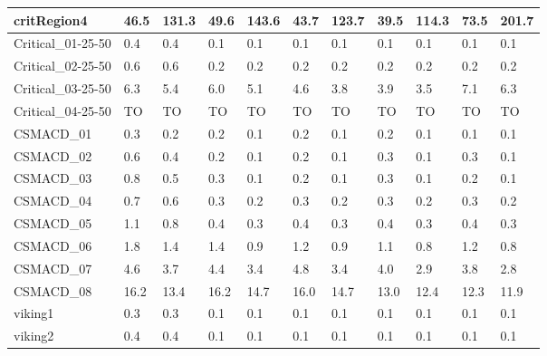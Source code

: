 \begin{table}
\begin{adjustbox}{max totalheight=\textheight}
\begin{tabular}{|l|llllllllll|}
    critRegion4        & 46.5     & 131.3    & 49.6     & 143.6    & 43.7     & 123.7    & 39.5     & 114.3    & 73.5     & 201.7    \\ \hline
    Critical\_01-25-50 & 0.4      & 0.4      & 0.1      & 0.1      & 0.1      & 0.1      & 0.1      & 0.1      & 0.1      & 0.1      \\
    Critical\_02-25-50 & 0.6      & 0.6      & 0.2      & 0.2      & 0.2      & 0.2      & 0.2      & 0.2      & 0.2      & 0.2      \\
    Critical\_03-25-50 & 6.3      & 5.4      & 6.0      & 5.1      & 4.6      & 3.8      & 3.9      & 3.5      & 7.1      & 6.3      \\
    Critical\_04-25-50 & TO       & TO       & TO       & TO       & TO       & TO       & TO       & TO       & TO       & TO       \\ \hline
    CSMACD\_01         & 0.3      & 0.2      & 0.2      & 0.1      & 0.2      & 0.1      & 0.2      & 0.1      & 0.1      & 0.1      \\
    CSMACD\_02         & 0.6      & 0.4      & 0.2      & 0.1      & 0.2      & 0.1      & 0.3      & 0.1      & 0.3      & 0.1      \\
    CSMACD\_03         & 0.8      & 0.5      & 0.3      & 0.1      & 0.2      & 0.1      & 0.3      & 0.1      & 0.2      & 0.1      \\
    CSMACD\_04         & 0.7      & 0.6      & 0.3      & 0.2      & 0.3      & 0.2      & 0.3      & 0.2      & 0.3      & 0.2      \\
    CSMACD\_05         & 1.1      & 0.8      & 0.4      & 0.3      & 0.4      & 0.3      & 0.4      & 0.3      & 0.4      & 0.3      \\
    CSMACD\_06         & 1.8      & 1.4      & 1.4      & 0.9      & 1.2      & 0.9      & 1.1      & 0.8      & 1.2      & 0.8      \\
    CSMACD\_07         & 4.6      & 3.7      & 4.4      & 3.4      & 4.8      & 3.4      & 4.0      & 2.9      & 3.8      & 2.8      \\
    CSMACD\_08         & 16.2     & 13.4     & 16.2     & 14.7     & 16.0     & 14.7     & 13.0     & 12.4     & 12.3     & 11.9     \\ \hline
    viking1            & 0.3      & 0.3      & 0.1      & 0.1      & 0.1      & 0.1      & 0.1      & 0.1      & 0.1      & 0.1      \\
    viking2            & 0.4      & 0.4      & 0.1      & 0.1      & 0.1      & 0.1      & 0.1      & 0.1      & 0.1      & 0.1      \\

\end{tabular}
\end{adjustbox}
\end{table}
